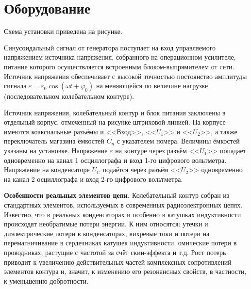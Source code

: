\section{Оборудование}
\begin{figure}[ht!]
\end{figure}

Схема установки приведена на рисунке.

Синусоидальный сигнал от генератора поступает на вход управляемого напряжением источника напряжения, собранного на операционном усилителе, питание которого осуществляется встроенным блоком-выпрямителем от сети.
Источник напряжения обеспечивает с высокой точностью постоянство амплитуды сигнала $ \varepsilon = \varepsilon_{0} \cos \left( \omega t + \varphi_{0}\right)$ на меняющейся по величине нагрузке (последовательном колебательном контуре).

Источник напряжения, колебательный контур и блок питания заключены в отдельный корпус, отмеченный на рисунке штриховой линией. На корпусе имеются коаксиальные разъёмы и <<Вход>>, <<$U_{1}$>> и <<$U_{2}$>>, а также переключатель магазина
ёмкостей $C_{n}$ с указателем номера. Величины ёмкостей указаны на установке. Напряжение $ \varepsilon $ на контуре через разъём <<$U_{1}$>> попадает одновременно на канал 1 осциллографа и вход 1-го цифрового вольтметра. Напряжение на
конденсаторе $U_{C}$ подаётся через разъём <<$U_{2}$>> одновременно на канал 2 осциллографа и вход 2-го цифрового вольтметра.

\textbf{Особенности реальных элементов цепи.} Колебательный контур  собран из стандартных элементов, используемых в современных радиоэлектронных цепях. Известно, что в реальных конденсаторах и особенно в катушках индуктивности происходят
необратимые потери энергии. К ним относятся: утечки и диэлектрические потери в конденсаторах, вихревые токи и потери на перемагничивание в сердечниках катушек индуктивности, омические потери в проводниках, растущие с частотой за счёт
скин-эффекта и т.д. Рост потерь приводит к увеличению действительных частей комплексных сопротивлений элементов контура и, значит, к изменению его резонансных свойств, в частности, к уменьшению добротности.

